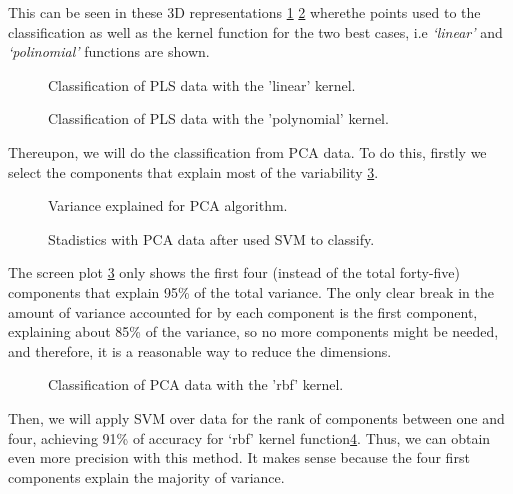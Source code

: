 This can be seen in these 3D representations \ref{fig:Classification3D_PLS_linear} \ref{fig:Classification3D_PLS_poly} wherethe points used to the classification as well as the kernel function for the two best cases, i.e \textit{‘linear’} and \textit{‘polinomial’} functions are shown.

\begin{figure}[H]
	\centering
	\caption{Classification of PLS data with the 'linear' kernel.}
	\label{fig:Classification3D_PLS_linear}
\end{figure}

\begin{figure}[H]
	\centering
	\caption{Classification of PLS data with the 'polynomial' kernel.}
	\label{fig:Classification3D_PLS_poly}
\end{figure}

Thereupon, we will do the classification from PCA data. To do this, firstly we select the components that explain most of the variability \ref{fig:variance_PCA}.

\begin{figure}[H]
	\centering
	\caption{Variance explained for PCA algorithm.}
	\label{fig:variance_PCA}
\end{figure} 

\begin{figure}[H]
	\centering
	\caption{Stadistics with PCA data after used SVM to classify.}
	\label{fig:stadistics_PCA}
	\end{figure}
	
The screen plot \ref{fig:variance_PCA} only shows the first four (instead of the total forty-five) components that explain 95\% of the total variance. The only clear break in the amount of variance accounted for by each component is the first component, explaining about 85\% of the variance, so no more components might be needed, and therefore, it is a reasonable way to reduce the dimensions.
\begin{figure}[H]
	\centering
	\caption{Classification of PCA data with the 'rbf' kernel.}
	\label{fig:Classification3D_PCA_rbf}
\end{figure}


Then, we will apply SVM over data for the rank of components between one and four, achieving 91\% of accuracy for ‘rbf’ kernel function\ref{fig:stadistics_PCA}. Thus, we can obtain even more precision with this method. It makes sense because the four first components explain the majority of variance.

